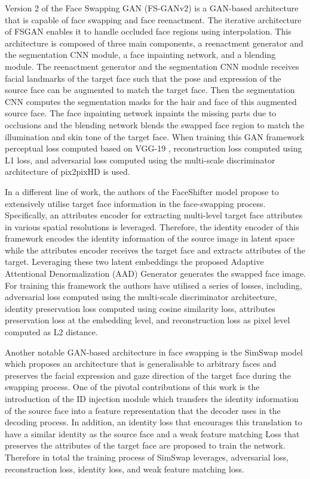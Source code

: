 Version 2 of the Face Swapping GAN (FS-GANv2) \cite{nirkin2022fsganv2} is a GAN-based architecture that is capable of face swapping and face reenactment. The iterative architecture of FSGAN enables it to handle occluded face regions using interpolation. This architecture is composed of three main components, a reenactment generator and the segmentation CNN module, a face inpainting network, and a blending module. The reenactment generator and the segmentation CNN module receives facial landmarks of the target face such that the pose and expression of the source face can be augmented to match the target face. Then the segmentation CNN computes the segmentation masks for the hair and face of this augmented source face. The face inpainting network inpaints the missing parts due to occlusions and the blending network blends the swapped face region to match the illumination and skin tone of the target face. When training this GAN framework perceptual loss computed based on VGG-19 \cite{simonyan2014very}, reconstruction loss computed using L1 loss, and adversarial loss computed using the multi-scale discriminator architecture of pix2pixHD \cite{wang2018high} is used.

In a different line of work, the authors of the FaceShifter \cite{li2019faceshifter} model propose to extensively utilise target face information in the face-swapping process. Specifically, an attributes encoder for extracting multi-level target face attributes in various spatial resolutions is leveraged. Therefore, the identity encoder of this framework encodes the identity information of the source image in latent space while the attributes encoder receives the target face and extracts attributes of the target. Leveraging these two latent embeddings the proposed Adaptive Attentional Denormalization (AAD) Generator generates the swapped face image. For training this framework the authors have utilised a series of losses, including, adversarial loss computed using the multi-scale discriminator architecture,  identity preservation loss computed using cosine similarity loss, attributes preservation loss at the embedding level, and reconstruction loss as pixel level computed as L2 distance. 

Another notable GAN-based architecture in face swapping is the SimSwap \cite{chen2020simswap} model which proposes an architecture that is generalisable to arbitrary faces and preserves the facial expression and gaze direction of the target face during the swapping process. One of the pivotal contributions of this work is the introduction of the ID injection module which transfers the identity information of the source face into a feature representation that the decoder uses in the decoding process. In addition, an identity loss that encourages this translation to have a similar identity as the source face and a weak feature matching Loss that preserves the attributes of the target face are proposed to train the network. Therefore in total the training process of SimSwap leverages, adversarial loss, reconstruction loss, identity loss, and weak feature matching loss. 


